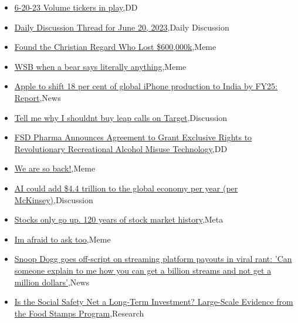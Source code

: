 \documentclass{article}%
\begin{document}
%
\begin{itemize}%
\item%
\href{https://reddit.com/r/wallstreetbets/comments/14e9cl8/62023\_volume\_tickers\_in\_play/}{6-20-23 Volume tickers in play},DD%
\item%
\href{https://reddit.com/r/wallstreetbets/comments/14e6w6p/daily\_discussion\_thread\_for\_june\_20\_2023/}{Daily Discussion Thread for June 20, 2023},Daily Discussion%
\item%
\href{https://reddit.com/r/wallstreetbets/comments/14e0p5p/found\_the\_christian\_regard\_who\_lost\_600000k/}{Found the Christian Regard Who Lost \$600,000k},Meme%
\item%
\href{https://reddit.com/r/wallstreetbets/comments/14dz1gf/wsb\_when\_a\_bear\_says\_literally\_anything/}{WSB when a bear says literally anything},Meme%
\item%
\href{https://reddit.com/r/wallstreetbets/comments/14dys07/apple\_to\_shift\_18\_per\_cent\_of\_global\_iphone/}{Apple to shift 18 per cent of global iPhone production to India by FY25: Report},News%
\item%
\href{https://reddit.com/r/wallstreetbets/comments/14dtqhr/tell\_me\_why\_i\_shouldnt\_buy\_leap\_calls\_on\_target/}{Tell me why I shouldnt buy leap calls on Target},Discussion%
\item%
\href{https://reddit.com/r/Baystreetbets/comments/14e9adj/fsd\_pharma\_announces\_agreement\_to\_grant\_exclusive/}{FSD Pharma Announces Agreement to Grant Exclusive Rights to Revolutionary Recreational Alcohol Misuse Technology},DD%
\item%
\href{https://reddit.com/r/StockMarket/comments/14e6k7w/we\_are\_so\_back/}{We are so back!},Meme%
\item%
\href{https://reddit.com/r/StockMarket/comments/14dssdf/ai\_could\_add\_44\_trillion\_to\_the\_global\_economy/}{AI could add \$4.4 trillion to the global economy per year (per McKinsey)},Discussion%
\item%
\href{https://reddit.com/r/StockMarket/comments/14dnxac/stocks\_only\_go\_up\_120\_years\_of\_stock\_market/}{Stocks only go up. 120 years of stock market history},Meta%
\item%
\href{https://reddit.com/r/StockMarket/comments/14dlq7a/im\_afraid\_to\_ask\_too/}{Im afraid to ask too},Meme%
\item%
\href{https://reddit.com/r/Economics/comments/14e434f/snoop\_dogg\_goes\_offscript\_on\_streaming\_platform/}{Snoop Dogg goes off-script on streaming platform payouts in viral rant: 'Can someone explain to me how you can get a billion streams and not get a million dollars'},News%
\item%
\href{https://reddit.com/r/Economics/comments/14e2btd/is\_the\_social\_safety\_net\_a\_longterm\_investment/}{Is the Social Safety Net a Long-Term Investment? Large-Scale Evidence from the Food Stamps Program},Research%
\end{itemize}%
\end{document}
